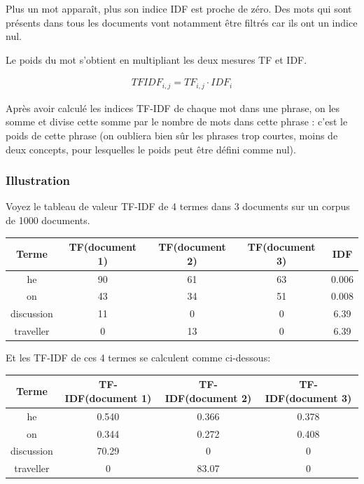 \documentclass[a4paper, 12pt]{article}
\begin{document}
Plus un mot apparaît, plus son indice IDF est proche de zéro. Des mots qui sont présents dans tous les documents vont notamment être filtrés car ils ont un indice nul.

\begin{definition}[TF-IDF]
Le poids du mot s'obtient en multipliant les deux mesures TF et IDF.
\end{definition}

\begin{align}
 TFIDF_{i,j} = TF_{i,j} \cdot  IDF_{i}
\end{align}

\begin{definition}
Après avoir calculé les indices TF-IDF de chaque mot dans une phrase, on les somme et divise cette somme par le nombre de mots dans cette phrase : c'est le poids de cette phrase (on oubliera bien sûr les phrases trop courtes, moins de deux concepts, pour lesquelles le poids peut être défini comme nul).
\end{definition}

\subsubsection{Illustration}
Voyez le tableau de valeur TF-IDF de 4 termes dans 3 documents sur un corpus de 1000 documents.
\begin{center}
	\begin{tabular}{|c|c|c|c|c|}
	 \hline
	 	Terme & TF(document 1) & TF(document 2) & TF(document 3) & IDF \\
	 \hline
	 	he & 90 & 61 & 63 & 0.006 \\
	 \hline
	 	on & 43 & 34 & 51 & 0.008 \\
	 \hline
	 	discussion & 11 & 0 & 0 & 6.39 \\
	 \hline
	 	traveller & 0 & 13 & 0 & 6.39 \\
	 \hline
	\end{tabular}
\end{center}

Et les TF-IDF de ces 4 termes se calculent comme ci-dessous:

\begin{center}
	\begin{tabular}{|c|c|c|c|}
	 \hline
	 	Terme & TF-IDF(document 1) & TF-IDF(document 2) & TF-IDF(document 3) \\
	 \hline
	 	he & 0.540 & 0.366 & 0.378 \\
	 \hline
	 	on & 0.344 & 0.272 & 0.408 \\
	 \hline
	 	discussion & 70.29 & 0 & 0 \\
	 \hline
	 	traveller & 0 & 83.07 & 0 \\
	 \hline
	\end{tabular}
\end{center}
\end{document}
